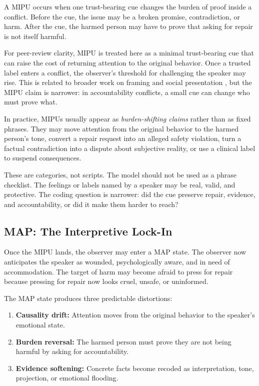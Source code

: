 \documentclass[11pt, letterpaper]{article}
\newcommand{\term}[1]{\textbf{#1}}
\begin{document}
A MIPU occurs when one trust-bearing cue changes the burden of proof inside a conflict. Before the cue, the issue may be a broken promise, contradiction, or harm. After the cue, the harmed person may have to prove that asking for repair is not itself harmful.

For peer-review clarity, MIPU is treated here as a minimal trust-bearing cue that can raise the cost of returning attention to the original behavior. Once a trusted label enters a conflict, the observer's threshold for challenging the speaker may rise. This is related to broader work on framing and social presentation \cite{TverskyKahneman1981,Goffman1959}, but the MIPU claim is narrower: in accountability conflicts, a small cue can change who must prove what.

In practice, MIPUs usually appear as \textit{burden-shifting claims} rather than as fixed phrases. They may move attention from the original behavior to the harmed person's tone, convert a repair request into an alleged safety violation, turn a factual contradiction into a dispute about subjective reality, or use a clinical label to suspend consequences.

These are categories, not scripts. The model should not be used as a phrase checklist. The feelings or labels named by a speaker may be real, valid, and protective. The coding question is narrower: did the cue preserve repair, evidence, and accountability, or did it make them harder to reach?

\subsection{MAP: The Interpretive Lock-In}

Once the MIPU lands, the observer may enter a MAP state. The observer now anticipates the speaker as wounded, psychologically aware, and in need of accommodation. The target of harm may become afraid to press for repair because pressing for repair now looks cruel, unsafe, or uninformed.

The MAP state produces three predictable distortions:

\begin{enumerate}
    \item \term{Causality drift:} Attention moves from the original behavior to the speaker's emotional state.
    \item \term{Burden reversal:} The harmed person must prove they are not being harmful by asking for accountability.
    \item \term{Evidence softening:} Concrete facts become recoded as interpretation, tone, projection, or emotional flooding.
\end{enumerate}
\end{document}
